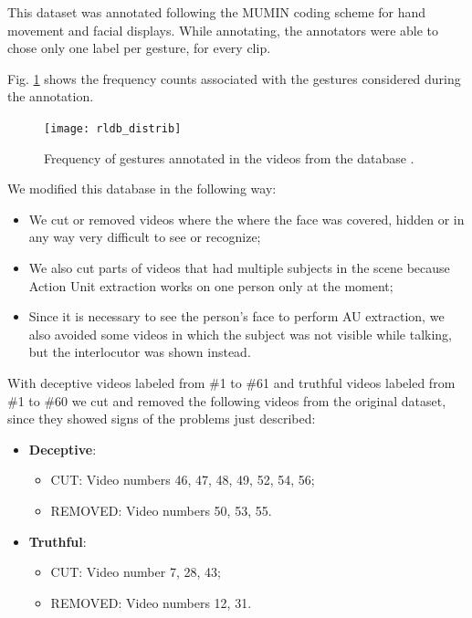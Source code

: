This dataset was annotated following the MUMIN coding scheme for hand movement and facial displays. While annotating, the annotators were able to chose only one label per gesture, for every clip.

Fig. \ref{fig:rldb_distrib} shows the frequency counts associated with the gestures considered during the annotation.

\begin{figure}[H]
	\centering
	\texttt{[image: rldb\_distrib]}
	\caption{Frequency of gestures annotated in the videos from the database \cite{Perez-Rosas:2015:DDU:2818346.2820758}.}
	\label{fig:rldb_distrib}
\end{figure}

We modified this database in the following way:
\begin{itemize}
	\item We cut or removed videos where the where the face was covered, hidden or in  any way very difficult to see or recognize;
	\item We also cut parts of videos that had multiple subjects in the scene because Action Unit extraction works on one person only at the moment;
	\item Since it is necessary to see the person's face to perform AU extraction, we also avoided some videos in which the subject was not visible while talking, but the interlocutor was shown instead.
\end{itemize}

With deceptive videos labeled from \#1 to \#61 and truthful videos labeled from \#1 to \#60 we cut and removed the following videos from the original dataset, since they showed signs of the problems just described:

\clearpage

\begin{itemize}
	\item \textbf{Deceptive}:
	\begin{itemize}
		\item CUT: Video numbers 46, 47, 48, 49, 52, 54, 56;
		\item REMOVED: Video numbers 50, 53,  55.
	\end{itemize}
	\item \textbf{Truthful}:
	\begin{itemize}
		\item CUT: Video number 7, 28, 43;
		\item REMOVED: Video numbers 12, 31. 
	\end{itemize}
\end{itemize}



